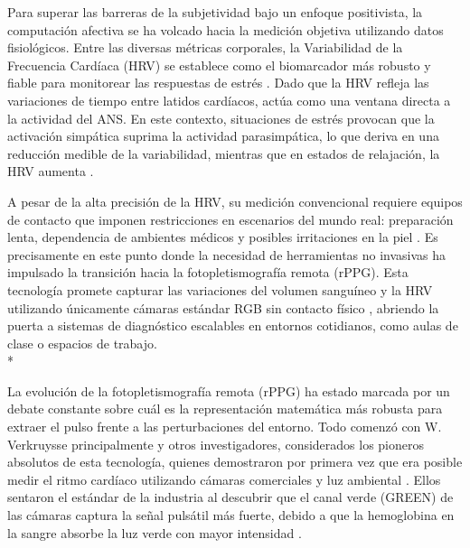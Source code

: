 Para superar las barreras de la subjetividad bajo un enfoque positivista, la computación afectiva se ha volcado hacia la medición 
objetiva utilizando datos fisiológicos. Entre las diversas métricas corporales, la Variabilidad de la Frecuencia Cardíaca (HRV) se 
establece como el biomarcador más robusto y fiable para monitorear las respuestas de estrés \cite{fontes2024enhancing, bahameish2024strategies, brown2026remote}. 
Dado que la HRV refleja las variaciones de tiempo entre latidos cardíacos, actúa como una ventana directa a la actividad del ANS. En este contexto, 
situaciones de estrés provocan que la activación simpática suprima la actividad parasimpática, lo que deriva en una reducción medible de la 
variabilidad, mientras que en estados de relajación, la HRV aumenta \cite{brown2026remote}.

A pesar de la alta precisión de la HRV, su medición convencional requiere equipos de contacto que imponen restricciones en escenarios del 
mundo real: preparación lenta, dependencia de ambientes médicos y posibles irritaciones en la piel \cite{fontes2024enhancing, brown2026remote, yue2024facial_peak}. 
Es precisamente en este punto donde la necesidad de herramientas no invasivas ha impulsado la transición hacia la fotopletismografía remota (rPPG). 
Esta tecnología promete capturar las variaciones del volumen sanguíneo y la HRV utilizando únicamente cámaras estándar RGB sin contacto físico 
\cite{fontes2024enhancing, yue2024facial_peak}, abriendo la puerta a sistemas de diagnóstico escalables en entornos cotidianos, como aulas de clase o 
espacios de trabajo. \\*



La evolución de la fotopletismografía remota (rPPG) ha estado marcada por un debate constante sobre cuál es la representación matemática más robusta para 
extraer el pulso frente a las perturbaciones del entorno. Todo comenzó con W. Verkruysse principalmente y otros investigadores, considerados los pioneros absolutos de esta tecnología, quienes 
demostraron por primera vez que era posible medir el ritmo cardíaco utilizando cámaras comerciales y luz ambiental \cite{wu2026udarppg, yue2024facial_peak, cao2024stphys}. Ellos sentaron el estándar de la industria 
al descubrir que el canal verde (GREEN) de las cámaras captura la señal pulsátil más fuerte, debido a que la hemoglobina en la sangre absorbe la luz verde con 
mayor intensidad \cite{yang2022assessment_dl, wu2026udarppg}.

